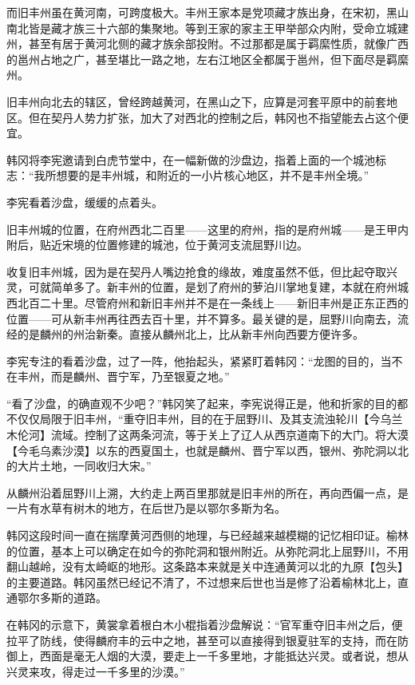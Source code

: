 而旧丰州虽在黄河南，可跨度极大。丰州王家本是党项藏才族出身，在宋初，黑山南北皆是藏才族三十六部的集聚地。等到王家的家主王甲举部众内附，受命立城建州，甚至有居于黄河北侧的藏才族余部投附。不过那都是属于羁縻性质，就像广西的邕州占地之广，甚至堪比一路之地，左右江地区全都属于邕州，但下面尽是羁縻州。

旧丰州向北去的辖区，曾经跨越黄河，在黑山之下，应算是河套平原中的前套地区。但在契丹人势力扩张，加大了对西北的控制之后，韩冈也不指望能去占这个便宜。

韩冈将李宪邀请到白虎节堂中，在一幅新做的沙盘边，指着上面的一个城池标志：“我所想要的是丰州城，和附近的一小片核心地区，并不是丰州全境。”

李宪看着沙盘，缓缓的点着头。

旧丰州城的位置，在府州西北二百里——这里的府州，指的是府州城——是王甲内附后，贴近宋境的位置修建的城池，位于黄河支流屈野川边。

收复旧丰州城，因为是在契丹人嘴边抢食的缘故，难度虽然不低，但比起夺取兴灵，可就简单多了。新丰州的位置，是划了府州的萝泊川掌地复建，本就在府州城西北百二十里。尽管府州和新旧丰州并不是在一条线上——新旧丰州是正东正西的位置——可从新丰州再往西去百十里，并不算多。最关键的是，屈野川向南去，流经的是麟州的州治新秦。直接从麟州北上，比从新丰州向西要方便许多。

李宪专注的看着沙盘，过了一阵，他抬起头，紧紧盯着韩冈：“龙图的目的，当不在丰州，而是麟州、晋宁军，乃至银夏之地。”

“看了沙盘，的确直观不少吧？”韩冈笑了起来，李宪说得正是，他和折家的目的都不仅仅局限于旧丰州，“重夺旧丰州，目的在于屈野川、及其支流浊轮川【今乌兰木伦河】流域。控制了这两条河流，等于关上了辽人从西京道南下的大门。将大漠【今毛乌素沙漠】以东的西夏国土，也就是麟州、晋宁军以西，银州、弥陀洞以北的大片土地，一同收归大宋。”

从麟州沿着屈野川上溯，大约走上两百里那就是旧丰州的所在，再向西偏一点，是一片有水草有树木的地方，在后世乃是以鄂尔多斯为名。

韩冈这段时间一直在揣摩黄河西侧的地理，与已经越来越模糊的记忆相印证。榆林的位置，基本上可以确定在如今的弥陀洞和银州附近。从弥陀洞北上屈野川，不用翻山越岭，没有太崎岖的地形。这条路本来就是关中连通黄河以北的九原【包头】的主要道路。韩冈虽然已经记不清了，不过想来后世也当是修了沿着榆林北上，直通鄂尔多斯的道路。

在韩冈的示意下，黄裳拿着根白木小棍指着沙盘解说：“官军重夺旧丰州之后，便拉平了防线，使得麟府丰的云中之地，甚至可以直接得到银夏驻军的支持，而在防御上，西面是毫无人烟的大漠，要走上一千多里地，才能抵达兴灵。或者说，想从兴灵来攻，得走过一千多里的沙漠。”

